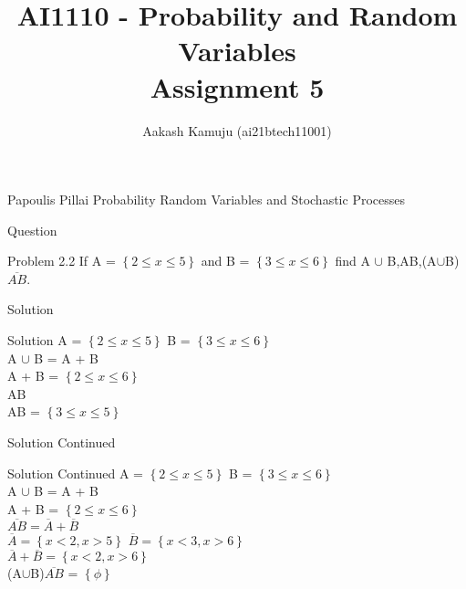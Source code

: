 \documentclass{beamer}
\title{AI1110 - Probability and Random Variables\\
        Assignment 5}
\author{Aakash Kamuju (ai21btech11001)}
\providecommand{\cbrak}[1]{\ensuremath{\left\{#1\right\}}}
\begin{document}
\maketitle
    \begin{frame}{Papoulis Pillai Probability Random Variables and Stochastic Processes}
        \begin{section}{Question}
            \begin{block}{Problem 2.2}
             If A = \cbrak{2 \le x \le 5} and B = \cbrak{3 \le x \le 6} find A $\cup$ B,AB,(A$\cup$B)$\overline{AB}$.
             
   \end{block}
    \end{section}
    \end{frame}
    \begin{frame}
        \begin{section}{Solution}
            \begin{block}{Solution}
             A = \cbrak{2 \le x \le 5} B = \cbrak{3 \le x \le 6}\\
             A $\cup$ B = A + B \\
             A + B = \cbrak{2 \le x \le 6}\\
             AB\\
             AB = \cbrak{3 \le x \le 5}
   \end{block}
    \end{section}
    \end{frame}
    \begin{frame}
        \begin{section}{Solution Continued}
            \begin{block}{Solution Continued}
             A = \cbrak{2 \le x \le 5} B = \cbrak{3 \le x \le 6}\\
             A $\cup$ B = A + B \\
             A + B = \cbrak{2 \le x \le 6}\\
             $\overline {AB} = \overline A + \overline B $\\
             $\overline A = \cbrak{x < 2, x > 5 }$
             $\overline B = \cbrak{x < 3, x > 6 }$\\
             $\overline A + \overline B  = \cbrak{x < 2, x > 6 }$\\
             (A$\cup$B)$\overline{AB}$ = \cbrak{\phi}
             
             
   \end{block}
    \end{section}
    \end{frame}
\end{document}
